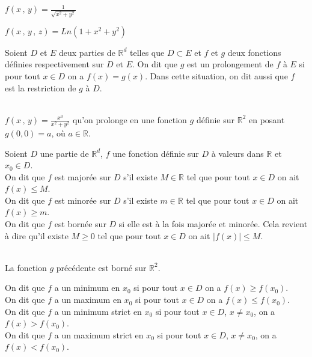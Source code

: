 \documentclass[class=report,crop=false]{standalone}
\begin{document}
\\
$f(x\,,\,y) = \displaystyle \frac {1}{\sqrt{x^2 + y^2}}$
\begin{center}
\end{center}
$f(x\,,\,y\,,\,z) =Ln (1 + x^2 + y^2)$
\begin{center}
\end{center}

\begin{definition}
Soient $D$ et $E$ deux parties de $\mathbb{R}^d$ telles que $D\subset E$ et $f$ et $g$ deux fonctions définies respectivement sur $D$ et $E$. On dit que $g$ est un prolongement de $f$ \`a $E$ si pour tout $x\in D$ on a $f(x)=g(x)$. Dans cette situation, on dit aussi que $f$ est la restriction de $g$ \`a $D$.
\end{definition}

\\
$f(x\,,\,y) = \displaystyle \frac {x^3}{x^2 + y^2}$ qu'on prolonge en une fonction $g$ définie sur $\mathbb R^2$ en posant $g(0,0)=a$, o\`u $a\in \mathbb R$.
 

\begin{definition}
Soient $D$ une partie de $\mathbb{R}^d$, $f$ une fonction définie sur $D$ \`a valeurs dans $\mathbb{R}$ et $x_0\in D$.\\
 On dit que $f$ est majorée sur $D$ s'il existe $M\in\mathbb{R}$ tel que pour tout $x\in D$ on ait
$f(x)\leq M$.\\
On dit que $f$ est minorée sur $D$ s'il existe $m\in\mathbb{R}$ tel que pour tout $x\in D$ on ait
$f(x)\geq m$.\\
On dit que $f$ est bornée sur $D$ si elle est \`a la fois majorée et minorée. Cela revient \`a dire qu'il existe $M\geq 0$ tel que pour tout $x\in D$ on ait
$|f(x)|\leq M$.
\end{definition}


\\
La fonction $g$ précédente est borné sur $\mathbb R^2$.


\begin{definition}
On dit que $f$ a un minimum en $x_0$ si pour tout $x\in D$ on a $f(x)\geq f(x_0)$.\\
On dit que $f$ a un maximum en $x_0$ si pour tout $x\in D$ on a $f(x)\leq f(x_0)$.\\
On dit que $f$ a un minimum  strict en $x_0$ si pour tout $x\in D$, $x\neq x_0$, on a $f(x)> f(x_0)$.\\
On dit que $f$ a un maximum  strict en $x_0$ si pour tout $x\in D$, $x\neq x_0$, on a $f(x)< f(x_0)$.\\
\end{definition}
\end{document}
